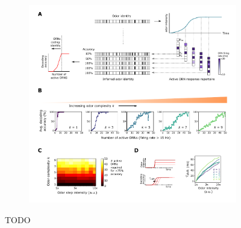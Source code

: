 \begin{figure}[!tb]
	\begin{subfigure}[t]{\linewidth}
		\includegraphics[width=\textwidth]{figures/5_primacy_coding}
		\label{fig:primacy_coding_a}	
	\end{subfigure}
	\begin{subfigure}[t]{0\linewidth}
		\label{fig:primacy_coding_b}
	\end{subfigure}
	\begin{subfigure}[t]{0\linewidth}
		\label{fig:primacy_coding_c}
	\end{subfigure}
	\begin{subfigure}[t]{0\linewidth}
		\label{fig:primacy_coding_d}
	\end{subfigure}
	\caption{\footnotesize{TODO}}
	\label{fig:primacy_coding}
\end{figure}



